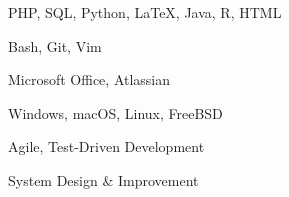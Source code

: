 
\vspace{-11.0mm}
\begin{cventries}
	
	\cventry
	{} %
	{} %
	{} %
	{} %
	{
		\begin{cvitems} %
		\begin{multicols}{2}
		\item{PHP, SQL, Python, LaTeX, Java, R, HTML}
		\item{Bash, Git, Vim}
		\item{Microsoft Office, Atlassian}
		\item{Windows, macOS, Linux, FreeBSD}
		\item{Agile, Test-Driven Development}
		\item{System Design \& Improvement}
		\end{multicols}
		\end{cvitems}
	}	

\end{cventries}